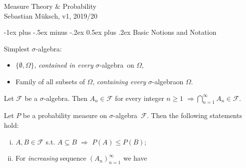\documentclass[10pt,landscape]{article}
\makeatletter
\renewcommand{\leq}{\leqslant}
\renewcommand{\geq}{\geqslant}
\newcommand{\SigmaAlgebra}{$\sigma$-algebra}
\newcommand{\CalF}{\mathcal{F}}
\renewcommand{\section}{\@startsection{section}{1}{0mm}%
                                {-1ex plus -.5ex minus -.2ex}%
                                {0.5ex plus .2ex}%
                                {\normalfont\large\bfseries}}
\makeatother
\begin{document}
\raggedright
\footnotesize
\begin{multicols}{3}


\setlength{\premulticols}{1pt}
\setlength{\postmulticols}{1pt}
\setlength{\multicolsep}{1pt}
\setlength{\columnsep}{2pt}
\setlength{\columnseprule}{0.4pt} %

\begin{center}
     \Large{Measure Theory \& Probability} \\
     \footnotesize{Sebastian Müksch, v1, 2019/20}
\end{center}


\section{Basic Notions and Notation}

\begin{example}{1.1}{}

    Simplest \SigmaAlgebra:

        \begin{itemize}
            \setlength{\parskip}{0em}
            \item $\{\emptyset, \Omega\}$, \emph{contained in every} \SigmaAlgebra \ on $\Omega$,
            \item Family of all subsets of $\Omega$, \emph{containing every} \SigmaAlgebra on $\Omega$.
        \end{itemize}

\end{example}

\begin{exercise}{1.1}{}

    Let $\CalF$ be a \SigmaAlgebra. Then $A_n \in \CalF$ for every integer $n \geq 1$ $\Rightarrow \bigcap_{n=1}^{\infty} A_n \in \CalF$.

\end{exercise}

\begin{proposition}{1.2}{}

    Let $P$ be a probability measure on \SigmaAlgebra\ $\CalF$. Then the following statements hold:

        \begin{enumerate}[(i)]
            \item $A, B \in \CalF$ s.t. $A \subseteq B$ $\Rightarrow$ $P(A) \leq P(B)$;
            \item For \emph{increasing} sequence $(A_n)_{n=1}^{\infty}$ we have


\end{enumerate}
\end{proposition}
\end{multicols}
\end{document}
